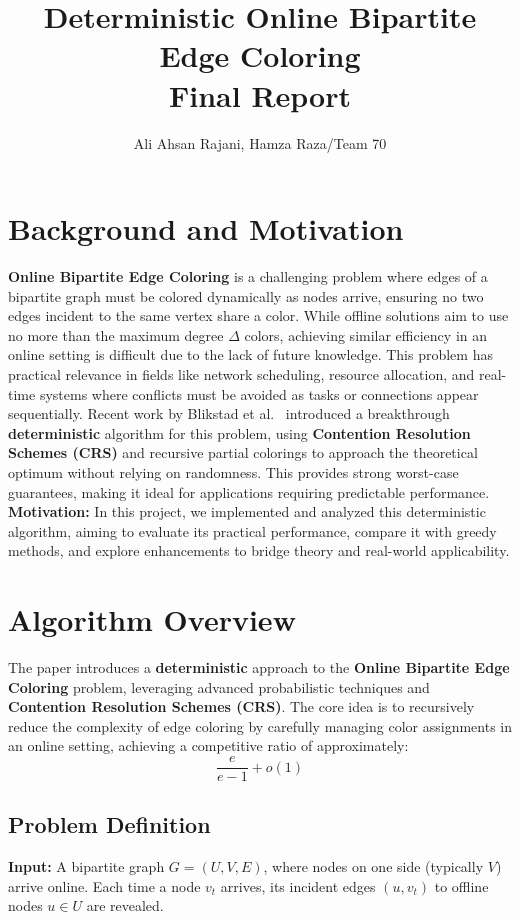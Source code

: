 \documentclass[11pt]{article}
\title{Deterministic Online Bipartite Edge Coloring \\ \large Final Report}
\author{Ali Ahsan Rajani, Hamza Raza/Team 70}
\begin{document}
\maketitle

\section{Background and Motivation}

\textbf{Online Bipartite Edge Coloring} is a challenging problem where edges of a bipartite graph must be colored dynamically as nodes arrive, ensuring no two edges incident to the same vertex share a color. While offline solutions aim to use no more than the maximum degree $\Delta$ colors, achieving similar efficiency in an online setting is difficult due to the lack of future knowledge. This problem has practical relevance in fields like network scheduling, resource allocation, and real-time systems where conflicts must be avoided as tasks or connections appear sequentially. Recent work by Blikstad et al.~\cite{blikstad2024} introduced a breakthrough \textbf{deterministic} algorithm for this problem, using \textbf{Contention Resolution Schemes (CRS)} and recursive partial colorings to approach the theoretical optimum without relying on randomness. This provides strong worst-case guarantees, making it ideal for applications requiring predictable performance.\\

\textbf{Motivation:} In this project, we implemented and analyzed this deterministic algorithm, aiming to evaluate its practical performance, compare it with greedy methods, and explore enhancements to bridge theory and real-world applicability.


\section{Algorithm Overview}

The paper introduces a \textbf{deterministic} approach to the \textbf{Online Bipartite Edge Coloring} problem, leveraging advanced probabilistic techniques and \textbf{Contention Resolution Schemes (CRS)}. The core idea is to recursively reduce the complexity of edge coloring by carefully managing color assignments in an online setting, achieving a competitive ratio of approximately:
\[
\frac{e}{e - 1} + o(1)
\]

\subsection*{Problem Definition}
\textbf{Input:} A bipartite graph $G = (U, V, E)$, where nodes on one side (typically $V$) arrive online. Each time a node $v_t$ arrives, its incident edges $(u, v_t)$ to offline nodes $u \in U$ are revealed.
\end{document}
